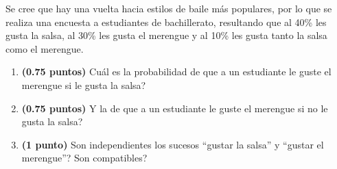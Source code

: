 
Se cree que hay una vuelta hacia estilos de baile más populares, por lo que se realiza una encuesta a estudiantes de bachillerato, resultando que al 40\% les gusta la salsa, al 30\% les gusta el merengue y al 10\% les gusta tanto la salsa como el merengue.
\begin{enumerate}[label=\alph*)]
\item \textbf{(0.75 puntos)} \textquestiondown{}Cuál es la probabilidad de que a un estudiante le guste el merengue si le gusta la salsa?
\item \textbf{(0.75 puntos)} \textquestiondown{}Y la de que a un estudiante le guste el merengue si no le gusta la salsa?
\item \textbf{(1 punto)} \textquestiondown{}Son independientes los sucesos ``gustar la salsa'' y ``gustar el merengue''? \textquestiondown{}Son compatibles?
\end{enumerate}
